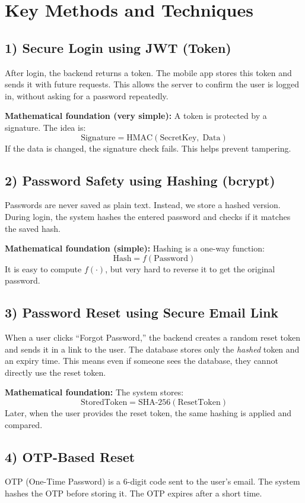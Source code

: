 \documentclass[12pt,a4paper]{report}
\begin{document}
\section*{Key Methods and Techniques}

\subsection*{1) Secure Login using JWT (Token)}
\noindent
After login, the backend returns a token. The mobile app stores this token and sends it with future requests. This allows the server to confirm the user is logged in, without asking for a password repeatedly.

\medskip
\noindent
\textbf{Mathematical foundation (very simple):} A token is protected by a signature. The idea is:
\[
\text{Signature} = \text{HMAC}( \text{SecretKey},\; \text{Data} )
\]
If the data is changed, the signature check fails. This helps prevent tampering.

\subsection*{2) Password Safety using Hashing (bcrypt)}
\noindent
Passwords are never saved as plain text. Instead, we store a hashed version. During login, the system hashes the entered password and checks if it matches the saved hash.

\medskip
\noindent
\textbf{Mathematical foundation (simple):} Hashing is a one-way function:
\[
\text{Hash} = f(\text{Password})
\]
It is easy to compute \(f(\cdot)\), but very hard to reverse it to get the original password.

\subsection*{3) Password Reset using Secure Email Link}
\noindent
When a user clicks ``Forgot Password,'' the backend creates a random reset token and sends it in a link to the user. The database stores only the \textit{hashed} token and an expiry time. This means even if someone sees the database, they cannot directly use the reset token.

\medskip
\noindent
\textbf{Mathematical foundation:} The system stores:
\[
\text{StoredToken} = \text{SHA-256}(\text{ResetToken})
\]
Later, when the user provides the reset token, the same hashing is applied and compared.

\subsection*{4) OTP-Based Reset}
\noindent
OTP (One-Time Password) is a 6-digit code sent to the user's email. The system hashes the OTP before storing it. The OTP expires after a short time.
\end{document}
